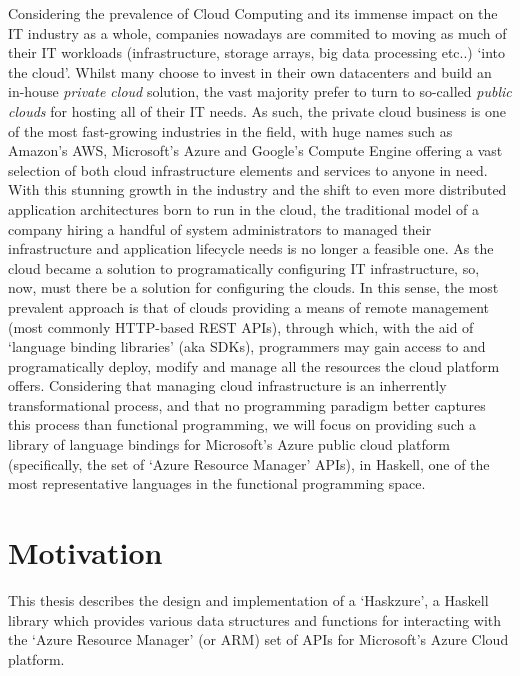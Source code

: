 \documentclass[11pt]{report}
\begin{document}
Considering the prevalence of Cloud Computing and its immense impact on the IT
industry as a whole, companies nowadays are commited to moving as much of their
IT workloads (infrastructure, storage arrays, big data processing etc..) `into
the cloud'. Whilst many choose to invest in their own datacenters and build
an in-house \textit{private cloud} solution, the vast majority prefer to turn
to so-called \textit{public clouds} for hosting all of their IT needs. As such,
the private cloud business is one of the most fast-growing industries in the
field, with huge names such as Amazon's AWS, Microsoft's Azure and Google's
Compute Engine offering a vast selection of both cloud infrastructure elements
and services to anyone in need. \newline
With this stunning growth in the industry and the shift to even more distributed
application architectures born to run in the cloud, the traditional model of a
company hiring a handful of system administrators to managed their
infrastructure and application lifecycle needs is no longer a feasible one.
As the cloud became a solution to programatically configuring IT
infrastructure, so, now, must there be a solution for configuring the clouds.
In this sense, the most prevalent approach is that of clouds providing a means of
remote management (most commonly HTTP-based REST APIs), through which, with the
aid of `language binding libraries' (aka SDKs), programmers may gain access to
and programatically deploy, modify and manage all the resources the cloud platform
offers. \newline
Considering that managing cloud infrastructure is an inherrently
transformational process, and that no programming paradigm better captures this
process than functional programming, we will focus on providing such a library
of language bindings for Microsoft's Azure public cloud platform (specifically,
the set of `Azure Resource Manager' APIs), in Haskell, one of the most
representative languages in the functional programming space.


\section{Motivation}

This thesis describes the design and implementation of a `Haskzure', a Haskell
library which provides various data structures and functions for interacting
with the `Azure Resource Manager' (or ARM) set of APIs for Microsoft's Azure
Cloud platform. \newline
\end{document}
